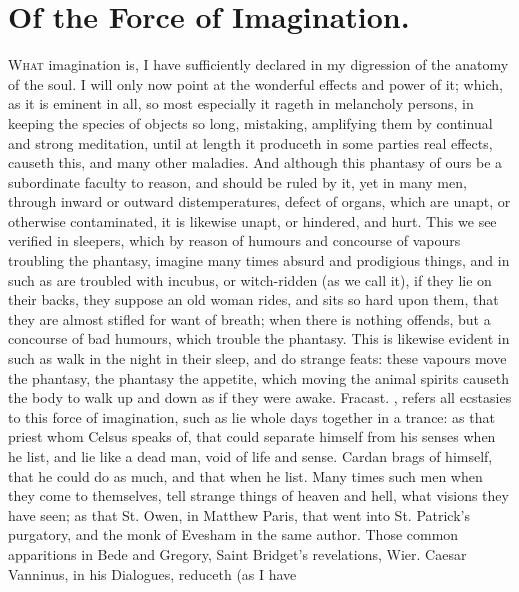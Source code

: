 \section{Of the Force of Imagination.}\label{sec:of-the-force-of-imagination}

\lettrine{W}{hat} imagination is, I have sufficiently declared in my digression
of the anatomy of the soul. I will only now point at the wonderful effects and
power of it; which, as it is eminent in all, so most especially it rageth in
melancholy persons, in keeping the species of objects so long, mistaking,
amplifying them by continual and strong meditation, until
at length it produceth in some parties real effects, causeth this, and many
other maladies. And although this phantasy of ours be a subordinate faculty to
reason, and should be ruled by it, yet in many men, through inward or outward
distemperatures, defect of organs, which are unapt, or otherwise contaminated,
it is likewise unapt, or hindered, and hurt. This we see verified in sleepers,
which by reason of humours and concourse of vapours troubling the phantasy,
imagine many times absurd and prodigious things, and in such as are troubled
with incubus, or witch-ridden (as we call it), if they lie on their backs, they
suppose an old woman rides, and sits so hard upon them, that they are almost
stifled for want of breath; when there is nothing offends, but a concourse of
bad humours, which trouble the phantasy. This is likewise evident in such as
walk in the night in their sleep, and do strange feats:
these vapours move the phantasy, the phantasy the
appetite, which moving the animal spirits causeth the body to walk up and down
as if they were awake. Fracast. ,
refers all ecstasies to this force of imagination, such as lie whole days
together in a trance: as that priest whom Celsus speaks
of, that could separate himself from his senses when he list, and lie like a
dead man, void of life and sense. Cardan brags of himself, that he could do as
much, and that when he list. Many times such men when they come to themselves,
tell strange things of heaven and hell, what visions they have seen; as that
St. Owen, in Matthew Paris, that went into St. Patrick's purgatory, and the
monk of Evesham in the same author. Those common apparitions in Bede and
Gregory, Saint Bridget's revelations, Wier.  Caesar Vanninus, in his Dialogues, \etc{} reduceth (as I have
